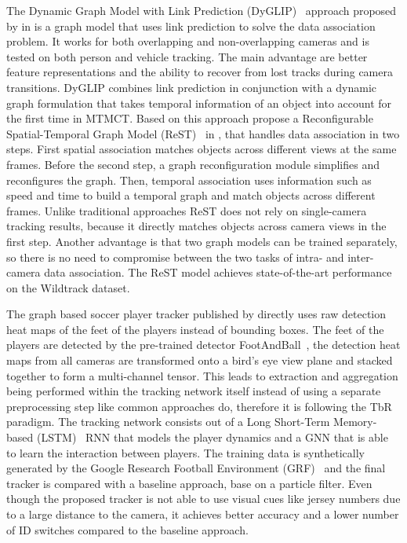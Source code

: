 The Dynamic Graph Model with Link Prediction (DyGLIP)~\cite{Quach21} approach proposed by \citeauthor{Quach21} in \citeyear{Quach21} is a graph model that uses link prediction to solve the data association problem. It works for both overlapping and non-overlapping cameras and is tested on both person and vehicle tracking. The main advantage are better feature representations and the ability to recover from lost tracks during camera transitions. DyGLIP combines link prediction in conjunction with a dynamic graph formulation that takes temporal information of an object into account for the first time in MTMCT. Based on this approach \citeauthor{Cheng23} propose a Reconfigurable Spatial-Temporal Graph Model (ReST)~\cite{Cheng23} in \citeyear{Cheng23}, that handles data association in two steps. First spatial association matches objects across different views at the same frames. Before the second step, a graph reconfiguration module simplifies and reconfigures the graph. Then, temporal association uses information such as speed and time to build a temporal graph and match objects across different frames. Unlike traditional approaches ReST does not rely on single-camera tracking results, because it directly matches objects across camera views in the first step. Another advantage is that two graph models can be trained separately, so there is no need to compromise between the two tasks of intra- and inter-camera data association. The ReST model achieves state-of-the-art performance on the Wildtrack dataset.

The graph based soccer player tracker published by \textcite{Komorowski22} directly uses raw detection heat maps of the feet of the players instead of bounding boxes. The feet of the players are detected by the pre-trained detector FootAndBall~\cite{Komorowski19}, the detection heat maps from all cameras are transformed onto a bird's eye view plane and stacked together to form a multi-channel tensor. This leads to extraction and aggregation being performed within the tracking network itself instead of using a separate preprocessing step like common approaches do, therefore it is following the TbR paradigm. The tracking network consists out of a Long Short-Term Memory-based (LSTM)~\cite{Gers02} RNN that models the player dynamics and a GNN that is able to learn the interaction between players. The training data is synthetically generated by the Google Research Football Environment (GRF)~\cite{Kurach19} and the final tracker is compared with a baseline approach, base on a particle filter. Even though the proposed tracker is not able to use visual cues like jersey numbers due to a large distance to the camera, it achieves better accuracy and a lower number of ID switches compared to the baseline approach.

